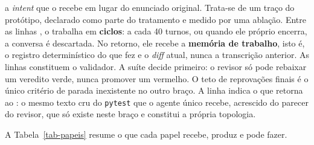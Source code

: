  a \textit{intent} que o  recebe em lugar do enunciado original. Trata-se de um traço do protótipo, declarado como parte do tratamento e medido por uma ablação.  Entre as linhas , o  trabalha em \textbf{ciclos}: a cada 40 turnos, ou quando ele próprio encerra, a conversa é descartada. No retorno, ele recebe a \textbf{memória de trabalho}, isto é, o registro determinístico do que fez e o \textit{diff} atual, nunca a transcrição anterior. As linhas  constituem o validador.   A suíte decide primeiro: o revisor só pode rebaixar um veredito verde, nunca promover um vermelho. O teto de  reprovações finais é o único critério de parada inexistente no outro braço. A linha  indica o que retorna ao : o mesmo texto cru do \texttt{pytest} que o agente único recebe, acrescido do parecer do revisor, que só existe neste braço e constitui a própria topologia. 

A Tabela~\ref{tab-papeis} resume o que cada papel recebe, produz e pode fazer.

